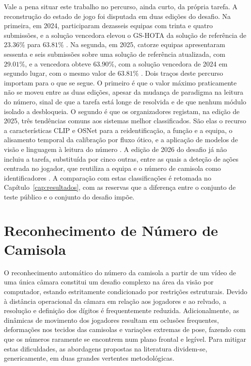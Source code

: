 Vale a pena situar este trabalho no percurso, ainda curto, da própria tarefa. A reconstrução do estado
de jogo foi disputada em duas edições do desafio. Na primeira, em 2024, participaram
dezasseis equipas com trinta e quatro submissões, e a solução vencedora elevou o GS-HOTA da
solução de referência de $23.36\%$ para $63.81\%$ \citep{cioppa2024soccernet}. Na segunda,
em 2025, catorze equipas apresentaram sessenta e seis submissões sobre uma solução de
referência atualizada, com $29.01\%$, e a vencedora obteve $63.90\%$, com a solução vencedora de 2024 em
segundo lugar, com o mesmo valor de $63.81\%$ \citep{giancola2025soccernet}. Dois traços deste percurso importam para o que se segue. O
primeiro é que o valor máximo praticamente não se moveu entre as duas edições, apesar da
mudança de paradigma na leitura do número, sinal de que a tarefa está longe de resolvida e de
que nenhum módulo isolado a desbloqueia. O segundo é que os
organizadores registam, na edição de 2025, três tendências comuns aos sistemas
melhor classificados. São elas o recurso a características CLIP e OSNet para a
reidentificação, a função e a equipa, o alisamento temporal da calibração por fluxo ótico, e a
aplicação de modelos de visão e linguagem à leitura do número
\citep{giancola2025soccernet}. A edição de 2026 do desafio já não incluiu a tarefa, substituída
por cinco outras, entre as quais a deteção de ações centrada no jogador, que reutiliza a
equipa e o número de camisola como identificadores \citep{cioppa2026soccernet}. A comparação
com estas classificações é retomada no Capítulo~\ref{cap:resultados}, com as reservas que a
diferença entre o conjunto de teste público e o conjunto do desafio impõe.

\section{Reconhecimento de Número de Camisola}

O reconhecimento automático do número da camisola a partir de um vídeo de uma única
câmara constitui um desafio complexo na área da visão por computador, estando estritamente
condicionado por restrições estruturais. Devido à distância operacional da câmara em
relação aos jogadores e ao relvado, a resolução e definição dos dígitos é frequentemente
reduzida. Adicionalmente, as dinâmicas de movimento dos jogadores resultam em oclusões
frequentes, deformações nos tecidos das camisolas e variações extremas de pose, fazendo
com que os números raramente se encontrem num plano frontal e legível. Para mitigar estas
dificuldades, as abordagens propostas na literatura dividem-se, genericamente, em duas
grandes vertentes metodológicas.

